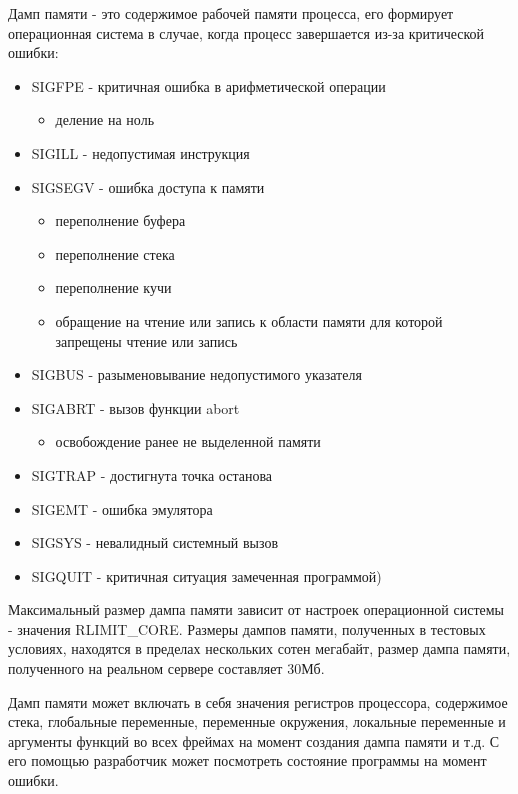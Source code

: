 \documentclass[20pt]{article}
\begin{document}
Дамп памяти\cite{wiki/coredump} - это содержимое рабочей памяти процесса, его
формирует операционная система в случае, когда процесс завершается из-за
критической ошибки\cite{core-dump-signals}:
\begin{itemize}\label{errors}
  \item SIGFPE - критичная ошибка в арифметической операции
  \begin{itemize}
    \item деление на ноль
  \end{itemize}
  \item SIGILL - недопустимая инструкция
  \item SIGSEGV - ошибка доступа к памяти
    \begin{itemize}
      \item переполнение буфера\cite{buffer-overflow}
      \item переполнение стека\cite{stack-overflow}
      \item переполнение кучи\cite{heap-overflow}
      \item обращение на чтение или запись к области памяти для которой запрещены
      чтение или запись\cite{memory-corruption}
    \end{itemize}
  \item SIGBUS - разыменовывание недопустимого указателя
  \item SIGABRT - вызов функции abort
    \begin{itemize}
      \item освобождение ранее не выделенной памяти
    \end{itemize}
  \item SIGTRAP - достигнута точка останова
  \item SIGEMT - ошибка эмулятора
  \item SIGSYS - невалидный системный вызов
  \item SIGQUIT - критичная ситуация замеченная программой)\cite{sigquit}
\end{itemize}

Максимальный размер дампа памяти зависит от настроек операционной системы -
значения RLIMIT\_CORE. Размеры дампов памяти, полученных в тестовых условиях,
находятся в пределах нескольких сотен мегабайт, размер дампа памяти, полученного
на реальном сервере составляет 30Мб.

Дамп памяти может включать в себя значения регистров процессора, содержимое стека,
глобальные переменные, переменные окружения, локальные переменные и аргументы
функций во всех фреймах на момент создания дампа памяти и т.д. С его помощью
разработчик может посмотреть состояние программы на момент ошибки.
\end{document}
